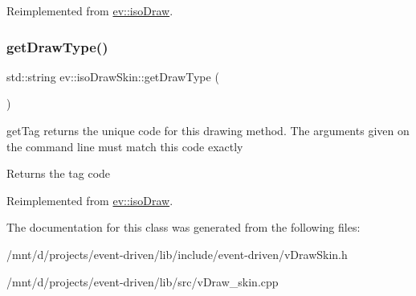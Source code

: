 Reimplemented from \hyperlink{classev_1_1isoDraw_ad481b618ae2d08664481ffc4b3c4dd95}{ev\+::iso\+Draw}.

\mbox{\label{classev_1_1isoDrawSkin_a9f1bce77ba050a37dfe151e2246779bc}} 
\subsubsection{\texorpdfstring{get\+Draw\+Type()}{getDrawType()}}
{\footnotesize\ttfamily std\+::string ev\+::iso\+Draw\+Skin\+::get\+Draw\+Type (\begin{DoxyParamCaption}{ }\end{DoxyParamCaption})\hspace{0.3cm}{\ttfamily [virtual]}}



get\+Tag returns the unique code for this drawing method. The arguments given on the command line must match this code exactly 

\begin{DoxyReturn}{Returns}
the tag code 
\end{DoxyReturn}


Reimplemented from \hyperlink{classev_1_1isoDraw_abd32cc393e5489ee97b5a8b94e6dd88d}{ev\+::iso\+Draw}.



The documentation for this class was generated from the following files\+:\begin{DoxyCompactItemize}
\item 
/mnt/d/projects/event-\/driven/lib/include/event-\/driven/v\+Draw\+Skin.\+h\item 
/mnt/d/projects/event-\/driven/lib/src/v\+Draw\+\_\+skin.\+cpp\end{DoxyCompactItemize}
